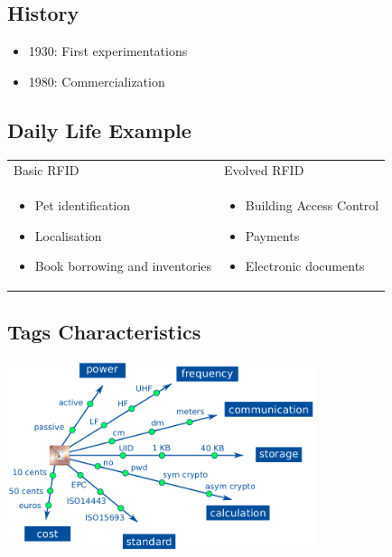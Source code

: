 \subsection{History}

\begin{itemize}
    \item 1930: First experimentations
    \item 1980: Commercialization
\end{itemize}


\subsection{Daily Life Example}

\begin{tabular}{m{6cm}m{6cm}}
	Basic RFID & Evolved RFID\\
		\begin{itemize}
    			\item Pet identification
    			\item Localisation
    			\item Book borrowing and inventories
		\end{itemize} &

	\begin{itemize}
			\item Building Access Control
			\item Payments
			\item Electronic documents
		\end{itemize}
\end{tabular}

	
\subsection{Tags Characteristics}
\begin{center}
    \includegraphics[width=9cm]{img/characRFID}
\end{center}

